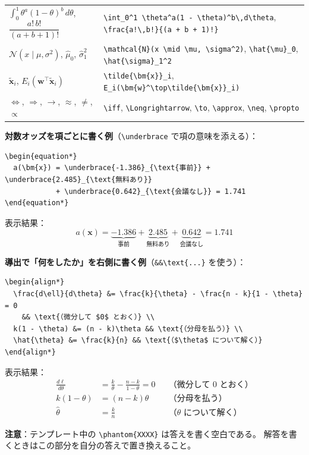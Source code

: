 \documentclass[a4paper,dvipdfmx]{jsarticle}
\newcommand{\提出期限}{2026年11月16日（月）}
\newcommand{\学籍番号}{0000000}
\newcommand{\氏名}{氏名を書く}
\newcommand{\提出日}{2026年11月16日}
\begin{document}
\begin{center}
\begin{tabular}{l|l}
$\int_0^1 \theta^a(1 - \theta)^b\,d\theta$, $\dfrac{a!\,b!}{(a + b + 1)!}$ & \verb|\int_0^1 \theta^a(1 - \theta)^b\,d\theta|, \verb|\frac{a!\,b!}{(a + b + 1)!}| \\
$\mathcal{N}(x \mid \mu, \sigma^2)$, $\hat{\mu}_0$, $\hat{\sigma}_1^2$ & \verb|\mathcal{N}(x \mid \mu, \sigma^2)|, \verb|\hat{\mu}_0|, \verb|\hat{\sigma}_1^2| \\
$\tilde{\bm{x}}_i$, $E_i(\bm{w}^\top\tilde{\bm{x}}_i)$ & \verb|\tilde{\bm{x}}_i|, \verb|E_i(\bm{w}^\top\tilde{\bm{x}}_i)| \\
$\iff$, $\Longrightarrow$, $\to$, $\approx$, $\neq$, $\propto$ & \verb|\iff|, \verb|\Longrightarrow|, \verb|\to|, \verb|\approx|, \verb|\neq|, \verb|\propto| \\
\hline
\end{tabular}
\end{center}

\noindent
\textbf{対数オッズを項ごとに書く例}（\verb|\underbrace| で項の意味を添える）：
\begin{verbatim}
\begin{equation*}
  a(\bm{x}) = \underbrace{-1.386}_{\text{事前}} + \underbrace{2.485}_{\text{無料あり}}
            + \underbrace{0.642}_{\text{会議なし}} = 1.741
\end{equation*}
\end{verbatim}
表示結果：
\begin{equation*}
  a(\bm{x}) = \underbrace{-1.386}_{\text{事前}} + \underbrace{2.485}_{\text{無料あり}}
            + \underbrace{0.642}_{\text{会議なし}} = 1.741
\end{equation*}

\noindent
\textbf{導出で「何をしたか」を右側に書く例}（\verb|&&\text{...}| を使う）：
\begin{verbatim}
\begin{align*}
  \frac{d\ell}{d\theta} &= \frac{k}{\theta} - \frac{n - k}{1 - \theta} = 0
    && \text{（微分して $0$ とおく）} \\
  k(1 - \theta) &= (n - k)\theta && \text{（分母を払う）} \\
  \hat{\theta} &= \frac{k}{n} && \text{（$\theta$ について解く）}
\end{align*}
\end{verbatim}
表示結果：
\begin{align*}
  \frac{d\ell}{d\theta} &= \frac{k}{\theta} - \frac{n - k}{1 - \theta} = 0
    && \text{（微分して $0$ とおく）} \\
  k(1 - \theta) &= (n - k)\theta && \text{（分母を払う）} \\
  \hat{\theta} &= \frac{k}{n} && \text{（$\theta$ について解く）}
\end{align*}

\noindent
\textbf{注意}：テンプレート中の \verb|\phantom{XXXX}| は答えを書く空白である。
解答を書くときはこの部分を自分の答えで置き換えること。
\end{document}
